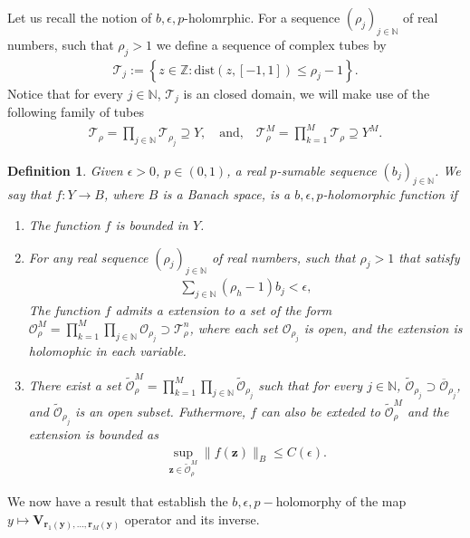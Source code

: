 \documentclass{article}
\newtheorem{definition}[theorem]{Definition}
\newcommand{\IN}{{\mathbb N}}
\newcommand{\IZ}{{\mathbb Z}}
\newcommand{\br}{\bm{r}}
\newcommand{\by}{\bm{y}}
\begin{document}
Let us recall the notion of $b,\epsilon,p$-holomrphic.  For a sequence $(\rho_j)_{j \in \IN}$ of real numbers, such that $\rho_j  >1$ we define a sequence of complex tubes by 
\begin{align*}
\mathcal{T}_j := \left\lbrace z \in \IZ : \text{dist}(z,[-1,1]) \leq \rho_j-1 \right\rbrace.
\end{align*}
Notice that for every $j \in \IN$, $\mathcal{T}_j$ is an closed domain, we will make use of the following family of tubes 
\begin{align*}
\mathcal{T}_{\rho} = \prod_{j \in \IN} \mathcal{T}_{\rho_j} \supseteq Y, \quad \text{and,} \quad
\mathcal{T}^M_{\rho} = \prod_{k=1}^M \mathcal{T}_{\rho} \supseteq Y^M.
\end{align*}


\begin{definition}
Given $\epsilon >0$, $p \in (0,1)$, a real $p$-sumable sequence $(b_j)_{j \in \IN}$. We say that $f:Y\rightarrow B$, where $B$ is a Banach space, is a $b,\epsilon,p$-holomorphic function if
\begin{enumerate}
\item The function $f$ is bounded in $Y$.
\item 
For any real sequence $(\rho_j)_{j \in \IN}$ of real numbers, such that $\rho_j  >1$ that satisfy 
\begin{align*}
\sum_{j \in \IN} (\rho_h -1) b_j < \epsilon, 
\end{align*}
The function $f$ admits a extension to a set of the form $\mathcal{O}^M_\rho = \prod_{k=1}^M \prod_{j \in \IN} \mathcal{O}_{\rho_j} \supset \mathcal{T}^n_\rho$, where each set $\mathcal{O}_{\rho_j}$ is open, and the extension is holomophic in each variable. 
\item 
There exist a set $\widetilde{\mathcal{O}}_\rho^M =  \prod_{k=1}^M \prod_{j \in \IN} \widetilde{\mathcal{O}}_{\rho_j}$ such that for every $j \in \IN$, $\widetilde{\mathcal{O}}_{\rho_j} \supset \overline{\mathcal{O}}_{\rho_j}$, and $\widetilde{\mathcal{O}}_{\rho_j}$ is an open subset. Futhermore, $f$ can also be exteded to $\widetilde{\mathcal{O}}_\rho^M$ and the extension is bounded as 
\begin{align*}
\sup_{\mathbf{z} \in \widetilde{\mathcal{O}}_\rho^M } \| f(\mathbf{z})\|_B \leq C(\epsilon).
\end{align*}
\end{enumerate}
\end{definition}
We now have a result that establish the $b,\epsilon,p-$holomorphy of the map  $y \mapsto \mathbf{V}_{\br_1(\by),\hdots,\br_M(\by)}$ operator and its inverse. 
\end{document}
